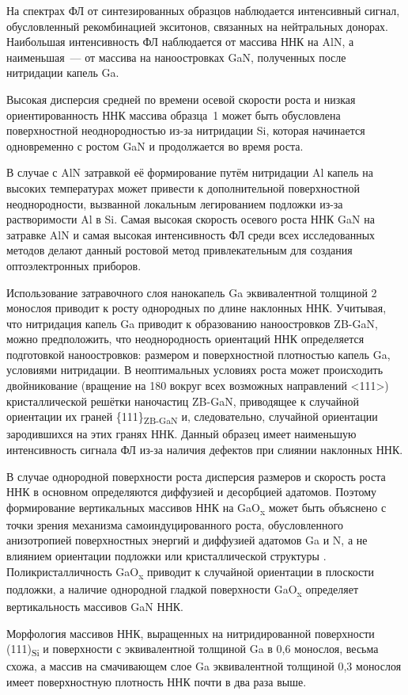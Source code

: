 На спектрах ФЛ от синтезированных образцов наблюдается интенсивный сигнал,
обусловленный рекомбинацией экситонов, связанных на нейтральных донорах.
Наибольшая интенсивность ФЛ наблюдается от массива ННК на AlN, а наименьшая~---
от массива на наноостровках GaN, полученных после нитридации капель Ga.

Высокая дисперсия средней по времени осевой скорости роста и низкая
ориентированность ННК массива образца~1 может быть обусловлена поверхностной
неоднородностью из-за нитридации Si, которая начинается одновременно с ростом
GaN и продолжается во время роста.

В случае с AlN затравкой её формирование путём нитридации Al капель на высоких
температурах может привести к дополнительной поверхностной неоднородности,
вызванной локальным легированием подложки из-за растворимости Al в Si. Самая
высокая скорость осевого роста ННК GaN на затравке AlN и самая высокая
интенсивность ФЛ среди всех исследованных методов делают данный ростовой метод
привлекательным для создания оптоэлектронных приборов.

Использование затравочного слоя нанокапель Ga эквивалентной толщиной 2 монослоя
приводит к росту однородных по длине наклонных ННК. Учитывая, что нитридация
капель Ga приводит к образованию наноостровков ZB-GaN, можно предположить, что
неоднородность ориентаций ННК определяется подготовкой наноостровков: размером
и поверхностной плотностью капель Ga, условиями нитридации. В неоптимальных
условиях роста может происходить двойникование (вращение на 180{\textdegree}
вокруг всех возможных направлений <111>) кристаллической решётки наночастиц
ZB-GaN, приводящее к случайной ориентации их граней
\{111\}\textsubscript{ZB-GaN} и, следовательно, случайной ориентации
зародившихся на этих гранях ННК. Данный образец имеет наименьшую интенсивность
сигнала ФЛ из-за наличия дефектов при слиянии наклонных ННК.

В случае однородной поверхности роста дисперсия размеров и скорость роста ННК в
основном определяются диффузией и десорбцией адатомов. Поэтому формирование
вертикальных массивов ННК на GaO\textsubscript{x} может быть объяснено с точки
зрения механизма самоиндуцированного роста, обусловленного анизотропией
поверхностных энергий и диффузией адатомов Ga и N, а не влиянием ориентации
подложки или кристаллической структуры \cite{Sobanska2016}.
Поликристалличность GaO\textsubscript{x} приводит к случайной ориентации в
плоскости подложки, а наличие однородной гладкой поверхности
GaO\textsubscript{x} определяет вертикальность массивов GaN ННК.

Морфология массивов ННК, выращенных на нитридированной поверхности
(111)\textsubscript{Si} и поверхности с эквивалентной толщиной Ga в 0,6
монослоя, весьма схожа, а массив на смачивающем слое Ga эквивалентной толщиной
0,3 монослоя имеет поверхностную плотность ННК почти в два раза выше.

\FloatBarrier

